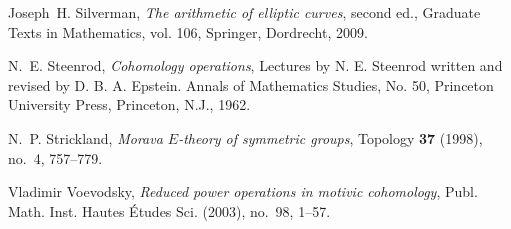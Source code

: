 \documentclass{gtpart}
\theoremstyle{definition}
\theoremstyle{remark}
\begin{document}
\begin{thebibliography}
Joseph~H. Silverman, \emph{The arithmetic of elliptic curves}, second ed.,
  Graduate Texts in Mathematics, vol. 106, Springer, Dordrecht, 2009.

N.~E. Steenrod, \emph{Cohomology operations}, Lectures by N. E. Steenrod
  written and revised by D. B. A. Epstein. Annals of Mathematics Studies, No.
  50, Princeton University Press, Princeton, N.J., 1962. 

N.~P. Strickland, \emph{Morava {$E$}-theory of symmetric groups}, Topology
  \textbf{37} (1998), no.~4, 757--779. 

Vladimir Voevodsky, \emph{Reduced power operations in motivic cohomology},
  Publ. Math. Inst. Hautes \'Etudes Sci. (2003), no.~98, 1--57. 

\end{thebibliography}
\end{document}
